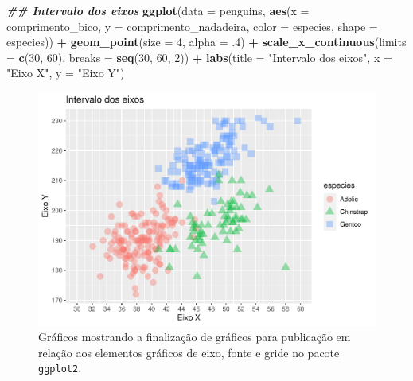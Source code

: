 \documentclass[
]{article}
\newenvironment{Shaded}{\begin{snugshade}}{\end{snugshade}}
\newcommand{\AttributeTok}[1]{\textcolor[rgb]{0.13,0.29,0.53}{#1}}
\newcommand{\DecValTok}[1]{\textcolor[rgb]{0.00,0.00,0.81}{#1}}
\newcommand{\DocumentationTok}[1]{\textcolor[rgb]{0.56,0.35,0.01}{\textbf{\textit{#1}}}}
\newcommand{\FunctionTok}[1]{\textcolor[rgb]{0.13,0.29,0.53}{\textbf{#1}}}
\newcommand{\NormalTok}[1]{#1}
\newcommand{\SpecialCharTok}[1]{\textcolor[rgb]{0.81,0.36,0.00}{\textbf{#1}}}
\newcommand{\StringTok}[1]{\textcolor[rgb]{0.31,0.60,0.02}{#1}}
\begin{document}
\begin{Shaded}
\begin{Highlighting}[]
\DocumentationTok{\#\# Intervalo dos eixos}
\FunctionTok{ggplot}\NormalTok{(}\AttributeTok{data =}\NormalTok{ penguins, }
       \FunctionTok{aes}\NormalTok{(}\AttributeTok{x =}\NormalTok{ comprimento\_bico, }\AttributeTok{y =}\NormalTok{ comprimento\_nadadeira,}
           \AttributeTok{color =}\NormalTok{ especies, }\AttributeTok{shape =}\NormalTok{ especies)) }\SpecialCharTok{+}
    \FunctionTok{geom\_point}\NormalTok{(}\AttributeTok{size =} \DecValTok{4}\NormalTok{, }\AttributeTok{alpha =}\NormalTok{ .}\DecValTok{4}\NormalTok{) }\SpecialCharTok{+}
    \FunctionTok{scale\_x\_continuous}\NormalTok{(}\AttributeTok{limits =} \FunctionTok{c}\NormalTok{(}\DecValTok{30}\NormalTok{, }\DecValTok{60}\NormalTok{), }\AttributeTok{breaks =} \FunctionTok{seq}\NormalTok{(}\DecValTok{30}\NormalTok{, }\DecValTok{60}\NormalTok{, }\DecValTok{2}\NormalTok{)) }\SpecialCharTok{+}
    \FunctionTok{labs}\NormalTok{(}\AttributeTok{title =} \StringTok{"Intervalo dos eixos"}\NormalTok{, }\AttributeTok{x =} \StringTok{"Eixo X"}\NormalTok{, }\AttributeTok{y =} \StringTok{"Eixo Y"}\NormalTok{)}
\end{Highlighting}
\end{Shaded}

\begin{figure}
\centering
\includegraphics{epr_files/figure-latex/fig-plot-final-eixos-2.pdf}
\caption{\label{fig:fig-plot-final-eixos-2}Gráficos mostrando a finalização de gráficos para publicação em relação aos elementos gráficos de eixo, fonte e gride no pacote \texttt{ggplot2}.}
\end{figure}
\end{document}
